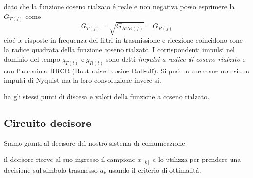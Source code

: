             dato che la funzione coseno rialzato é reale e non negativa posso esprimere la $G_{T(f)}$ come
            \[
                G_{T(f)} = \sqrt{G_{RCR(f)}} = G_{R(f)}    
            \] 
            cioé le risposte in frequenza dei filtri in trasmissione e ricezione coincidono cone la radice
            quadrata della funzione coseno rialzato. I corrispondenti impulsi nel dominio del tempo 
            $g_{T(t)}$ e $g_{R(t)}$ sono detti \emph{impulsi a radice di coseno rialzato} e con l'acronimo RRCR
            (Root raised cosine Roll-off). Si puó notare come non siano impulsi di Nyquist ma la loro convoluzione 
            invece si.
            \begin{figure}[H]
                \centering
                \hfill
            \end{figure}           
            ha gli stessi punti di discesa e valori della funzione a coseno rialzato.
    \subsection{Circuito decisore}
        Siamo giunti al decisore del nostro sistema di comunicazione
        \begin{figure}[H]
            \centering
        \end{figure}        
        il decisore riceve al suo ingresso il campione $x_{[k]}$ e lo utilizza per prendere una decisione sul simbolo trasmesso
        $a_k$ usando il criterio di ottimalitá.
